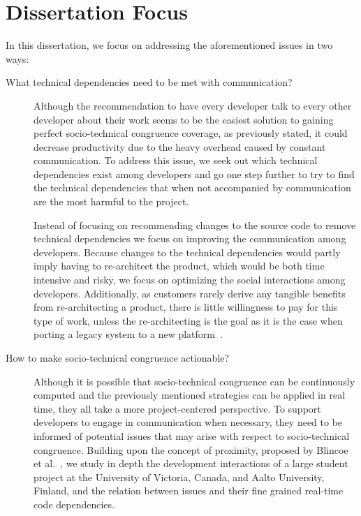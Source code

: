 \section{Dissertation Focus}
In this dissertation, we focus on addressing the aforementioned issues in two ways:
\begin{description}
\item[What technical dependencies need to be met with communication?] 
Although the recommendation to have every developer talk to every other developer about their work seems to be the easiest solution to gaining perfect socio-technical congruence coverage, as previously stated, it could decrease productivity due to the heavy overhead caused by  constant communication.
To address this issue, we seek out which technical dependencies exist among developers and go one step further to try to find the technical dependencies that when not accompanied by communication are the most harmful to the project.

Instead of focusing on recommending changes to the source code to remove technical dependencies we focus on improving the communication among developers.
Because changes to the technical dependencies would partly imply having to re-architect the product, which would be both time intensive and risky, we focus on optimizing the social interactions among developers.
Additionally, as customers rarely derive any tangible benefits from re-architecting a product, there is little willingness to pay for this type of work, unless the re-architecting is the goal as it is the case when porting a legacy system to a new platform~\cite{klinger:mtd:2011}.

\item[How to make socio-technical congruence actionable?] Although it is possible that socio-technical congruence can be continuously computed and the previously mentioned strategies can be applied in real time, they all take a more project-centered perspective.
To support developers to engage in communication when necessary, they need to be informed of potential issues that may arise with respect to socio-technical congruence.
Building upon the concept of proximity, proposed by Blincoe et al.~\cite{blincoe:cscw:2012}, we study in depth the development interactions of a large student project at the University of Victoria, Canada, and Aalto University, Finland, and the relation between issues and their fine grained real-time code dependencies.
\end{description}

